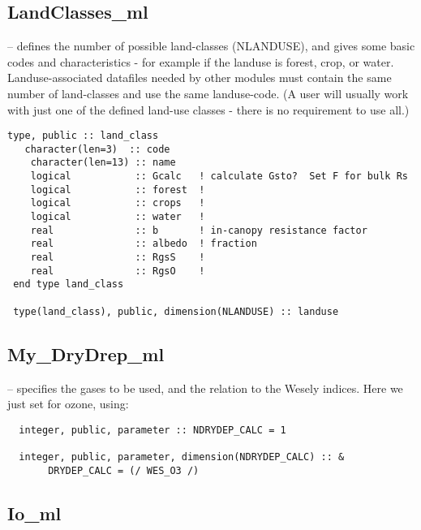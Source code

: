 \documentclass[12pt]{article}
\begin{document}
\subsection{LandClasses\_ml}

--  defines the number of possible land-classes (NLANDUSE), and gives some
  basic codes and characteristics - for example if the landuse is forest,
  crop, or water. Landuse-associated datafiles needed by other
  modules must contain the same number of land-classes and use the same 
  landuse-code. (A user will usually work with just one of the defined
  land-use classes - there is no requirement to use all.)

\begin{footnotesize}
\begin{verbatim}
type, public :: land_class
   character(len=3)  :: code
    character(len=13) :: name
    logical           :: Gcalc   ! calculate Gsto?  Set F for bulk Rs
    logical           :: forest  !
    logical           :: crops   !
    logical           :: water   !
    real              :: b       ! in-canopy resistance factor
    real              :: albedo  ! fraction
    real              :: RgsS    !
    real              :: RgsO    !
 end type land_class

 type(land_class), public, dimension(NLANDUSE) :: landuse
\end{verbatim}
\end{footnotesize}


\subsection{My\_DryDrep\_ml}

  -- specifies the gases to be used, and the relation to the
Wesely indices. Here we just set for ozone, using:

\begin{footnotesize}
\begin{verbatim}
  integer, public, parameter :: NDRYDEP_CALC = 1

  integer, public, parameter, dimension(NDRYDEP_CALC) :: &
       DRYDEP_CALC = (/ WES_O3 /)
\end{verbatim}
\end{footnotesize}



\subsection{Io\_ml}
\end{document}
